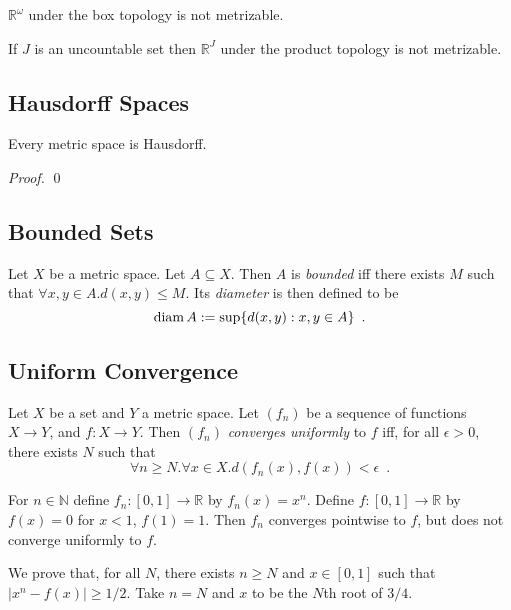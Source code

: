 \begin{cor}
$\mathbb{R}^\omega$ under the box topology is not metrizable.
\end{cor}

\begin{cor}
If $J$ is an uncountable set then $\mathbb{R}^J$ under the product topology is not metrizable.
\end{cor}

\subsection{Hausdorff Spaces}

\begin{prop}
Every metric space is Hausdorff.
\end{prop}

\begin{proof}
\pf
{}
\qed
\end{proof}

\subsection{Bounded Sets}

\begin{df}[Bounded]
Let $X$ be a metric space. Let $A \subseteq X$. Then $A$ is \emph{bounded} iff there exists $M$ such that $\forall x,y \in A. d(x,y) \leq M$. Its \emph{diameter} is then defined to be
\[ \operatorname{diam} A := \sup \{ d(x,y) : x,y \in A \} \enspace . \]
\end{df}

\subsection{Uniform Convergence}

\begin{df}
Let $X$ be a set and $Y$ a metric space. Let $(f_n)$ be a sequence of functions $X \rightarrow Y$, and $f : X \rightarrow Y$. Then $(f_n)$ \emph{converges uniformly} to $f$ iff, for all $\epsilon > 0$, there exists $N$ such that
\[ \forall n \geq N. \forall x \in X. d(f_n(x),f(x)) < \epsilon \enspace . \]
\end{df}

\begin{ex}
For $n \in \mathbb{N}$ define $f_n : [0,1] \rightarrow \mathbb{R}$ by $f_n(x) = x^n$. Define $f : [0,1] \rightarrow \mathbb{R}$ by $f(x) = 0$ for $x < 1$, $f(1) = 1$. Then $f_n$ converges pointwise to $f$, but does not converge uniformly to $f$.

We prove that, for all $N$, there exists $n \geq N$ and $x \in [0,1]$ such that $|x^n - f(x)| \geq 1/2$. Take $n = N$ and $x$ to be the $N$th root of $3/4$.
\end{ex}


